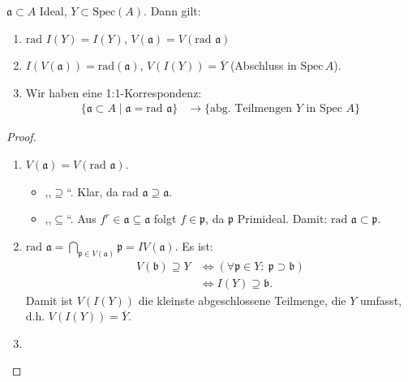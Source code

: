 \begin{prop} $\mathfrak{a}\subset A$ Ideal,
  $Y\subset\text{Spec}(A)$. Dann gilt:
  \begin{enumerate}
  \item $\text{rad }I(Y)=I(Y)$, $V(\mathfrak{a})=V(\text{rad
    }\mathfrak{a})$
  \item $I(V(\mathfrak{a}))=\text{rad}(\mathfrak{a})$,
    $V(I(Y))=\overline{Y}$ (Abschluss in $\text{Spec}\,A$).
  \item Wir haben eine 1:1-Korrespondenz:
    \begin{align*} \{\mathfrak{a}\subset A\mid\mathfrak{a}=\text{rad
      }\mathfrak{a}\} & \longrightarrow\{\text{abg. Teilmengen }Y\text{ in
                        Spec }A\}
    \end{align*}
  \end{enumerate}
\end{prop}
\begin{proof} \mbox{}
  \begin{enumerate}
  \item $V(\mathfrak{a})=V(\text{rad }\mathfrak{a})$.
    \begin{itemize}
    \item ,,$\supseteq$``. Klar, da rad
      $\mathfrak{a}\supseteq\mathfrak{a}$.
    \item ,,$\subseteq$``. Aus $f^{r}\in\mathfrak{a}\subseteq\mathfrak{a}$
      folgt $f\in\mathfrak{p}$, da $\mathfrak{p}$ Primideal. Damit:
      $\text{rad }\mathfrak{a}\subset\mathfrak{p}.$
    \end{itemize}
  \item $\text{rad }\mathfrak{a}=\bigcap_{\mathfrak{p}\in
      V(\mathfrak{a})}\mathfrak{p}=IV(\mathfrak{a})$.  Es ist:
    \begin{align*}
      V(\mathfrak{b})\supseteq Y & \Leftrightarrow(\forall\mathfrak{p}\in Y:\
                                   \mathfrak{p}\supset\mathfrak{b})\\
                                 & \Leftrightarrow
                                   I(Y)\supseteq\mathfrak{b}.
    \end{align*} Damit ist $V(I(Y))$ die kleinste abgeschlossene
    Teilmenge, die $Y$ umfasst, d.h. $V(I(Y))=\overline{Y}$.
  \item
  \end{enumerate}
\end{proof}
